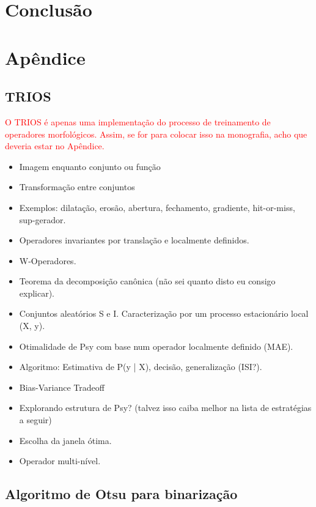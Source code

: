 \documentclass[a4paper,11pt]{article}
\newcommand{\TODO}[1]{\textcolor{red}{#1}}
\begin{document}
\section{Conclusão}


\section{Apêndice}

\subsection{TRIOS}

\TODO{O TRIOS é apenas uma implementação do processo de treinamento de
  operadores morfológicos. Assim, se for para colocar isso na
  monografia, acho que deveria estar no Apêndice.}
      \begin{itemize}
        \item Imagem enquanto conjunto ou função
        \item Transformação entre conjuntos
        \item Exemplos: dilatação, erosão, abertura, fechamento, gradiente, hit-or-miss, sup-gerador.
        \item Operadores invariantes por translação e localmente definidos.
        \item W-Operadores.
        \item Teorema da decomposição canônica (não sei quanto disto eu consigo explicar).
        \item Conjuntos aleatórios S e I. Caracterização por um processo estacionário local (X, y).
        \item Otimalidade de Psy com base num operador localmente definido (MAE).
        \item Algoritmo: Estimativa de P(y | X), decisão, generalização (ISI?).
        \item Bias-Variance Tradeoff
        \item Explorando estrutura de Psy? (talvez isso caiba melhor na lista de estratégias a seguir)
        \item Escolha da janela ótima.
        \item Operador multi-nível.
      \end{itemize}

  \subsection{Algoritmo de Otsu para binarização}
\end{document}
